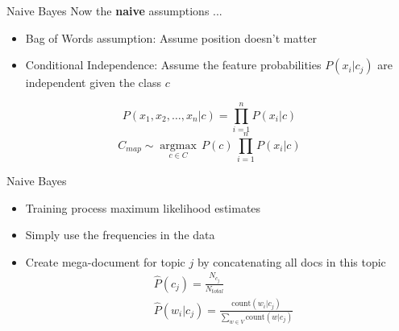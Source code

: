 \documentclass[11pt]{beamer}
\begin{document}
\begin{frame}{Naive Bayes}
Now the \textbf{naive} assumptions ...
\begin{itemize}
\item Bag of Words assumption: Assume position doesn’t matter
\item Conditional Independence: Assume the feature probabilities $P(x_i|c_j)$ are independent given the class $c$
\end{itemize}
\begin{equation}
P(x_1, x_2, \dots, x_n \vert c) = \prod\limits_{i=1}^n P(x_i \vert c)
\end{equation}
\begin{equation}
C_{map} \sim \underset{c \in C}{\operatorname{argmax}} \, P(c) \, \prod\limits_{i=1}^n P(x_i \vert c)
\end{equation}
\end{frame}
\begin{frame}{Naive Bayes}
\begin{itemize}
\item Training process maximum likelihood estimates
\item Simply use the frequencies in the data
\item Create mega-document for topic $j$ by concatenating all docs in this topic
\begin{align*}
& \hat P (c_j) = \frac{N_{c_j}}{N_{total}} \\
& \hat P (w_i \vert c_j) = \frac{\text{count}(w_i \vert c_j)}{\sum\limits_{w \in V} \text{count}(w \vert c_j)}
\end{align*}
\end{itemize}
\end{frame}
\end{document}
